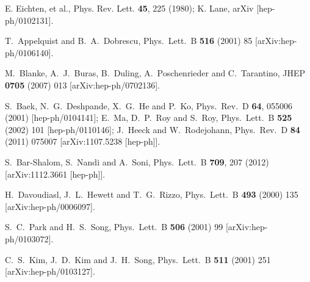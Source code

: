 \begin{thebibliography}{99}
 E. Eichten, et al., Phys. Rev. Lett. {\bf 45}, 225 (1980);
K. Lane, arXiv [hep-ph/0102131].

 T.~Appelquist and B.~A.~Dobrescu, 
Phys.\ Lett.\ B
\textbf{516}
(2001) 85 [arXiv:hep-ph/0106140]. %

  M.~Blanke, A.~J.~Buras, B.~Duling, A.~Poschenrieder and C.~Tarantino,
  JHEP {\bf 0705} (2007) 013
  [arXiv:hep-ph/0702136].


  S.~Baek, N.~G.~Deshpande, X.~G.~He and P.~Ko,
  Phys.\ Rev.\ D {\bf 64}, 055006 (2001)
  [hep-ph/0104141];
  E.~Ma, D.~P.~Roy and S.~Roy,
  Phys.\ Lett.\ B {\bf 525} (2002) 101
  [hep-ph/0110146];
%
  J.~Heeck and W.~Rodejohann,
  Phys.\ Rev.\ D {\bf 84} (2011) 075007
  [arXiv:1107.5238 [hep-ph]].

  S.~Bar-Shalom, S.~Nandi and A.~Soni,
  Phys.\ Lett.\ B {\bf 709}, 207 (2012)
  [arXiv:1112.3661 [hep-ph]].


  H.~Davoudiasl, J.~L.~Hewett and T.~G.~Rizzo,
  Phys.\ Lett.\  B {\bf 493} (2000) 135
  [arXiv:hep-ph/0006097].

S.~C.~Park and H.~S.~Song,
Phys.\ Lett.\  B {\bf 506} (2001) 99 [arXiv:hep-ph/0103072].

  C.~S.~Kim, J.~D.~Kim and J.~H.~Song,
  Phys.\ Lett.\  B {\bf 511} (2001) 251
  [arXiv:hep-ph/0103127].


\end{thebibliography}
